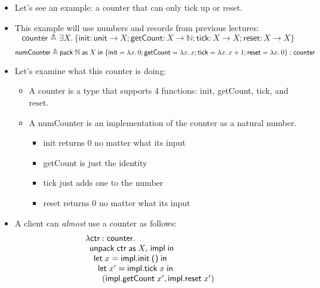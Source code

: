 \documentclass{lecturenotes}
\newcommand{\abs}[2]{\ensuremath{\lambda #1.\,#2}}
\newcommand{\app}[2]{\ensuremath{#1\;#2}}
\newcommand{\utype}{\textsf{unit}\xspace}
\newcommand{\unit}{\ensuremath{\textsf{(}\mkern0.5mu\textsf{)}}}
\newcommand{\extype}[2]{\ensuremath{\exists #1.\,#2}}
\newcommand{\pack}[3]{\ensuremath{\textsf{pack}\mkern5mu#1\mathrel{\textsf{as}}#2\mathrel{\textsf{in}}#3}}
\begin{document}
\begin{itemize}
\item Let's see an example: a counter that can only tick up or reset.
\item This example will use numbers and records from previous lectures:
  $$\textsf{counter} \triangleq \extype{X}{\{\textsf{init} : \utype \to X; \textsf{getCount} : X \to \mathbb{N}; \textsf{tick} : X \to X; \textsf{reset} : X \to X\}}$$
  $$\textsf{numCounter} \triangleq \pack{\mathbb{N}}{X}{\{\textsf{init} = \abs{x}{0}; \textsf{getCount} = \abs{x}{x}; \textsf{tick} = \abs{x}{x + 1}; \textsf{reset} = \abs{x}{0}\}} : \textsf{counter}$$
\item Let's examine what this counter is doing:
  \begin{itemize}
  \item A counter is a type that supports 4 functions: \textsf{init}, \textsf{getCount}, \textsf{tick}, and \textsf{reset}.
  \item A \textsf{numCounter} is an implementation of the counter as a natural number.
    \begin{itemize}
    \item \textsf{init} returns 0 no matter what its input
    \item \textsf{getCount} is just the identity
    \item \textsf{tick} just adds one to the number
    \item \textsf{reset} returns 0 no matter what its input
    \end{itemize}
  \end{itemize}
\item A client can \emph{almost} use a counter as follows:
  $$
  \begin{array}{l}
    \lambda \textsf{ctr} \mathrel{:} \textsf{counter}.\\
    \begin{array}{l}
      \textsf{unpack}\mkern5mu\textsf{ctr} \mathrel{\textsf{as}} X,\, \textsf{impl}\;\textsf{in}\\
      \begin{array}{l}
        \textsf{let}\mkern5mux = \app{\textsf{impl}.\textsf{init}}{\unit}\;\textsf{in}\\
        \begin{array}{l}
          \textsf{let}\mkern5mux' = \app{\textsf{impl}.\textsf{tick}}{x}\;\textsf{in}\\
          \begin{array}{l}
            (\app{\textsf{impl}.\textsf{getCount}}{x'}, \app{\textsf{impl}.\textsf{reset}}{x'})

\end{array}
\end{array}
\end{array}
\end{array}
\end{array}$$
\end{itemize}
\end{document}
